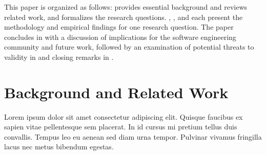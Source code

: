 \documentclass[sigconf,nonacm]{acmart} %
\begin{document}
This paper is organized as follows: 
 provides essential background and reviews related work, and 
 formalizes the research questions.
, , and  each present the methodology and empirical findings for one research question.
The paper concludes in  with a discussion of implications for the software engineering community and future work, followed by an examination of potential threats to validity in  and closing remarks in .

\section{Background and Related Work}
\label{sec:background}

Lorem ipsum dolor sit amet consectetur adipiscing elit. 
Quisque faucibus ex sapien vitae pellentesque sem placerat.
In id cursus mi pretium tellus duis convallis. 
Tempus leo eu aenean sed diam urna tempor.
Pulvinar vivamus fringilla lacus nec metus bibendum egestas. 

\end{document}
